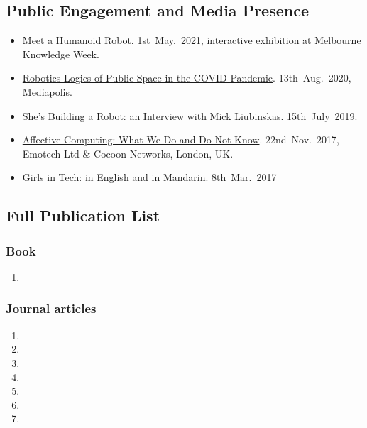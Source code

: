 \documentclass[11pt,letterpaper]{article}
\begin{document}
\subsection*{Public Engagement and Media Presence}
\begin{itemize}
  \item \href{https://mkw.melbourne.vic.gov.au/event/meet-a-humanoid-robot/}{Meet a Humanoid Robot}. 1st~May.~2021, interactive exhibition at Melbourne Knowledge Week.  
  \item \href{https://www.mediapolisjournal.com/2020/08/robotic-logics-of-public-space/}{Robotics Logics of Public Space in the COVID Pandemic}. 13th~Aug.~2020, Mediapolis.
  \item \href{https://medium.com/shes-building-a-robot/leimin-tian-9843a1080cd8}{She's Building a Robot: an Interview with Mick Liubinskas}. 15th~July~2019.
  \item \href{https://www.eventbrite.co.uk/e/meet-ai-series-6-tickets-39512362540#}{Affective Computing: What We Do and Do Not Know}. 22nd~Nov.~2017, Emotech Ltd \& Cocoon Networks, London, UK.
  \item \href{https://youtu.be/6Cd_BquE95Q}{Girls in Tech}: in \href{https://youtu.be/dMMtaeqWGlg}{English} and in \href{https://youtu.be/G0cfdK36wTE}{Mandarin}. 8th~Mar.~2017
\end{itemize}


\subsection*{Full Publication List}\label{pub_full}
\subsubsection*{Book}
\begin{enumerate}
\item {}
\end{enumerate}

\subsubsection*{Journal articles}
\begin{enumerate}
\item {}
\item {}
\item {}
\item {}
\item {}
\item {}
\item {}
\end{enumerate}
\end{document}
